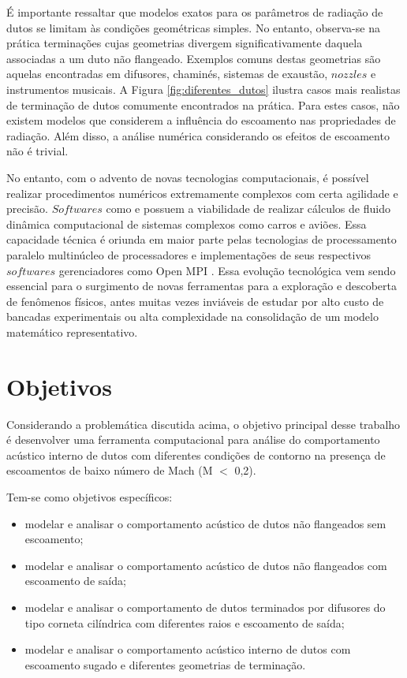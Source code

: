 É importante ressaltar que modelos exatos para os parâmetros de radiação de dutos se limitam às condições geométricas simples. No entanto, observa-se na prática terminações cujas geometrias divergem significativamente daquela associadas a um duto não flangeado. Exemplos comuns destas geometrias são aquelas encontradas em difusores, chaminés, sistemas de exaustão, $nozzles$ e instrumentos musicais. A Figura \ref{fig:diferentes_dutos} ilustra casos mais realistas de terminação de dutos comumente encontrados na prática. Para estes casos, não existem modelos que considerem a influência do escoamento nas propriedades de radiação. Além disso, a análise numérica considerando os efeitos de escoamento não é trivial.

No entanto, com o advento de novas tecnologias computacionais, é possível realizar procedimentos numéricos extremamente complexos com certa agilidade e precisão. $Softwares$ como  e  possuem a viabilidade de realizar cálculos de fluido dinâmica computacional de sistemas complexos como carros e aviões. Essa capacidade técnica é oriunda em maior parte pelas tecnologias de processamento paralelo multinúcleo de processadores e implementações de seus respectivos $softwares$ gerenciadores como Open MPI . Essa evolução tecnológica vem sendo essencial para o surgimento de novas ferramentas para a exploração e descoberta de fenômenos físicos, antes muitas vezes inviáveis de estudar por alto custo de bancadas experimentais ou alta complexidade na consolidação de um modelo matemático representativo.  


\section{Objetivos}

Considerando a problemática discutida acima, o objetivo principal desse trabalho é desenvolver uma ferramenta computacional para análise do comportamento acústico interno de dutos com diferentes condições de contorno na presença de escoamentos de baixo número de Mach (M $<$ 0,2).

Tem-se como objetivos específicos:
\begin{itemize}
    \item modelar e analisar o comportamento acústico de dutos não flangeados sem escoamento;
    \item modelar e analisar o comportamento acústico de dutos não flangeados com escoamento de saída;
    \item modelar e analisar o comportamento de dutos terminados por difusores do tipo corneta cilíndrica com diferentes raios e escoamento de saída;
    \item modelar e analisar o comportamento acústico interno de dutos com escoamento sugado e diferentes geometrias de terminação.
\end{itemize}

